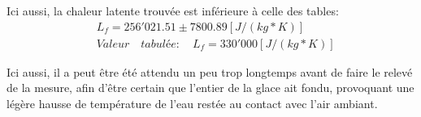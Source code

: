 Ici aussi, la chaleur latente trouvée est inférieure à celle des tables:
\begin{align*}
    &L_f = 256'021.51 \pm 7800.89[J/ (kg*K)]\\
    &Valeur\quad tabulée:\quad L_f = 330'000[J/ (kg*K)]
\end{align*}

Ici aussi, il a peut être été attendu un peu trop longtemps avant de faire le relevé de la mesure, afin d'être certain que l'entier de la glace ait fondu, provoquant une légère hausse de température de l'eau restée au contact avec l'air ambiant.

